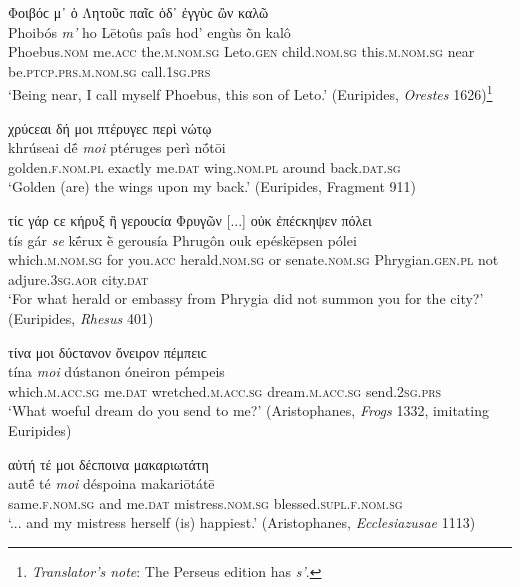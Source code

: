 \begin{exe}
\ex Φοιβόϲ μ᾽ ὁ Λητοῦϲ παῖϲ ὁδ᾽ ἐγγὺϲ ὢν καλῶ\\
\gll Phoibós \emph{m'} ho Lētoûs paîs hod' engùs ṑn kalô\\
Phoebus.\textsc{nom} me.\textsc{acc} the\textsc{.m.nom.sg} Leto.\textsc{gen} child.\textsc{nom.sg} this.\textsc{m.nom.sg} near be.\textsc{ptcp.prs.m.nom.sg} call.\textsc{1sg.prs}\\
\trans `Being near, I call myself Phoebus, this son of Leto.' (Euripides, \textit{Orestes} 1626)\footnote{\emph{Translator's note}: The Perseus edition has \textit{s'}.}
\label{attsep13}
\end{exe}

\begin{exe}
\ex χρύϲεαι δή μοι πτέρυγεϲ περὶ νώτῳ\\
\gll khrúseai dḗ \emph{moi} ptéruges perì nṓtōi\\
golden.\textsc{f.nom.pl} exactly me.\textsc{dat} wing.\textsc{nom.pl} around back.\textsc{dat.sg}\\
\trans `Golden (are) the wings upon my back.' (Euripides, Fragment 911)
\label{attsep14}
\end{exe}

\begin{exe}
\ex τίϲ γάρ ϲε κήρυξ ἢ γερουϲία Φρυγῶν {[}...{]} οὐκ ἐπέϲκηψεν πόλει\\
\gll tís gár \emph{se} kḗrux ḕ gerousía Phrugôn ouk epéskēpsen pólei\\
which.\textsc{m.nom.sg} for you.\textsc{acc} herald.\textsc{nom.sg}
or senate.\textsc{nom.sg} Phrygian.\textsc{gen.pl} not adjure.\textsc{3sg.aor} city.\textsc{dat}\\
\trans `For what herald or embassy from Phrygia did not summon you for the city?' (Euripides, \textit{Rhesus} 401)
\label{attsep15}
\end{exe}

\begin{exe}
\ex τίνα μοι δύϲτανον ὄνειρον πέμπειϲ\\
\gll tína \emph{moi} dústanon óneiron pémpeis\\
which.\textsc{m.acc.sg} me.\textsc{dat} wretched.\textsc{m.acc.sg}
dream.\textsc{m.acc.sg} send.\textsc{2sg.prs}\\
\trans `What woeful dream do you send to me?' (Aristophanes, \textit{Frogs} 1332, imitating Euripides)
\label{attsep16}
\end{exe}

\begin{exe}
\ex αὐτή τέ μοι δέϲποινα μακαριωτάτη\\
\gll autḗ té \emph{moi} déspoina makariōtátē\\
same.\textsc{f.nom.sg} and me.\textsc{dat} mistress.\textsc{nom.sg}
blessed.\textsc{supl.f.nom.sg}\\
\trans `... and my mistress herself (is) happiest.' (Aristophanes, \textit{Ecclesiazusae} 1113)
\label{attsep17}
\end{exe}


